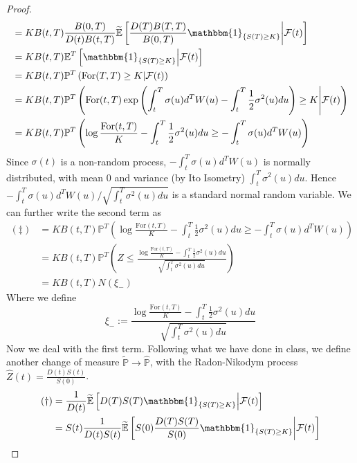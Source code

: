 \documentclass[a4paper, 10pt]{article}
\theoremstyle{definition}
\theoremstyle{hSol}
\begin{document}
\begin{proof}
\begin{equation}
\begin{split}
    &= KB(t,T)\frac{B(0,T)}{D(t)B(t,T)} \widetilde{\mathbb{E}}\left[\frac{D(T)B(T,T)}{B(0,T)} \mathbbm{1}_{\{S(T)\geq K\}}\middle|\mathcal{F}(t)\right] \\
    &= KB(t,T)\mathbb{E}^T\left[ \mathbbm{1}_{\{S(T)\geq K\}}\middle|\mathcal{F}(t)\right]\\
    &= KB(t,T)\mathbb{P}^T\left( \text{For}(T,T)\geq K \middle|\mathcal{F}(t)\right)\\
    &= KB(t,T)\mathbb{P}^T\left(\text{For}(t,T)\exp\left(\int_t^T \sigma(u)d^TW(u) - \int_t^T \frac{1}{2}\sigma^2(u)du\right)\geq K \middle|\mathcal{F}(t)\right)\\
    &= KB(t,T)\mathbb{P}^T\left(\log \frac{\text{For}(t,T)}{K} - \int_t^T \frac{1}{2}\sigma^2(u)du\geq -\int_t^T \sigma(u)d^TW(u) \right)\\
  \end{split}
\end{equation}
Since $\sigma(t)$ is a non-random process, $-\int_t^T \sigma(u)d^TW(u)$ is normally distributed, with mean $0$ and variance (by Ito Isometry) $\int_t^T\sigma^2(u)du$. Hence $-\int_t^T \sigma(u)d^TW(u)/\sqrt{\int_t^T\sigma^2(u)du}$ is a standard normal random variable. We can further write the second term as
\begin{equation}
  \begin{split}
    (\ddag) &= KB(t,T)\mathbb{P}^T\left(\log \frac{\text{For}(t,T)}{K} - \int_t^T \frac{1}{2}\sigma^2(u)du\geq -\int_t^T \sigma(u)d^TW(u) \right)\\
    &=KB(t,T)\mathbb{P}^T\left(Z \leq \frac{\log \frac{\text{For}(t,T)}{K} - \int_t^T \frac{1}{2}\sigma^2(u)du}{\sqrt{\int_t^T\sigma^2(u)du}}\right)\\
    &=KB(t,T)N(\xi_-)
  \end{split}
\end{equation}
Where we define
$$
\xi_- := \frac{\log \frac{\text{For}(t,T)}{K} - \int_t^T \frac{1}{2}\sigma^2(u)du}{\sqrt{\int_t^T\sigma^2(u)du}}
$$
Now we deal with the first term. Following what we have done in class, we define another change of measure $\widetilde{\mathbb{P}} \to \widehat{\mathbb{P}}$, with the Radon-Nikodym process $\widehat{Z}(t) = \frac{D(t)S(t)}{S(0)}$. 
\begin{equation}
  \begin{split}
    (\dag) &= \frac{1}{D(t)} \widetilde{\mathbb{E}}\left[D(T)S(T) \mathbbm{1}_{\{S(T)\geq K\}}\middle|\mathcal{F}(t)\right]\\
    &=S(t)\frac{1}{D(t)S(t)} \widetilde{\mathbb{E}}\left[S(0)\frac{D(T)S(T)}{S(0)} \mathbbm{1}_{\{S(T)\geq K\}}\middle|\mathcal{F}(t)\right]\\

\end{split}
\end{equation}
\end{proof}
\end{document}
